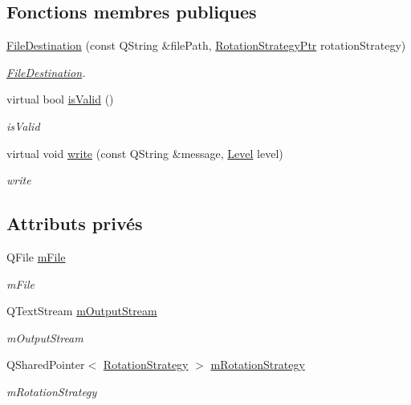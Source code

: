 \subsection*{Fonctions membres publiques}
\begin{DoxyCompactItemize}
\item 
\hyperlink{classQsLogging_1_1FileDestination_ad42d6551d58f82eeb61ffc6d7d06d5cd}{File\-Destination} (const Q\-String \&file\-Path, \hyperlink{namespaceQsLogging_a41dc81d39cd3d36d9e15746bd9174be0}{Rotation\-Strategy\-Ptr} rotation\-Strategy)
\begin{DoxyCompactList}\small\item\em \hyperlink{classQsLogging_1_1FileDestination}{File\-Destination}. \end{DoxyCompactList}\item 
virtual bool \hyperlink{classQsLogging_1_1FileDestination_a2d18b70b408910332dcbee9d12c1d394}{is\-Valid} ()
\begin{DoxyCompactList}\small\item\em is\-Valid \end{DoxyCompactList}\item 
virtual void \hyperlink{classQsLogging_1_1FileDestination_a84b076720ccfa4045e1aacc14c5af5dc}{write} (const Q\-String \&message, \hyperlink{namespaceQsLogging_a38c7dd87e4de6f8eb460763ad0baa033}{Level} level)
\begin{DoxyCompactList}\small\item\em write \end{DoxyCompactList}\end{DoxyCompactItemize}
\subsection*{Attributs privés}
\begin{DoxyCompactItemize}
\item 
Q\-File \hyperlink{classQsLogging_1_1FileDestination_a1de182fa4efefa21e6545757f1a04eb2}{m\-File}
\begin{DoxyCompactList}\small\item\em m\-File \end{DoxyCompactList}\item 
Q\-Text\-Stream \hyperlink{classQsLogging_1_1FileDestination_a10f0aa5513ec40d3e362179b084a43d6}{m\-Output\-Stream}
\begin{DoxyCompactList}\small\item\em m\-Output\-Stream \end{DoxyCompactList}\item 
Q\-Shared\-Pointer$<$ \hyperlink{classQsLogging_1_1RotationStrategy}{Rotation\-Strategy} $>$ \hyperlink{classQsLogging_1_1FileDestination_ab20945842bd063b5cbe82485168be1f0}{m\-Rotation\-Strategy}
\begin{DoxyCompactList}\small\item\em m\-Rotation\-Strategy \end{DoxyCompactList}\end{DoxyCompactItemize}


